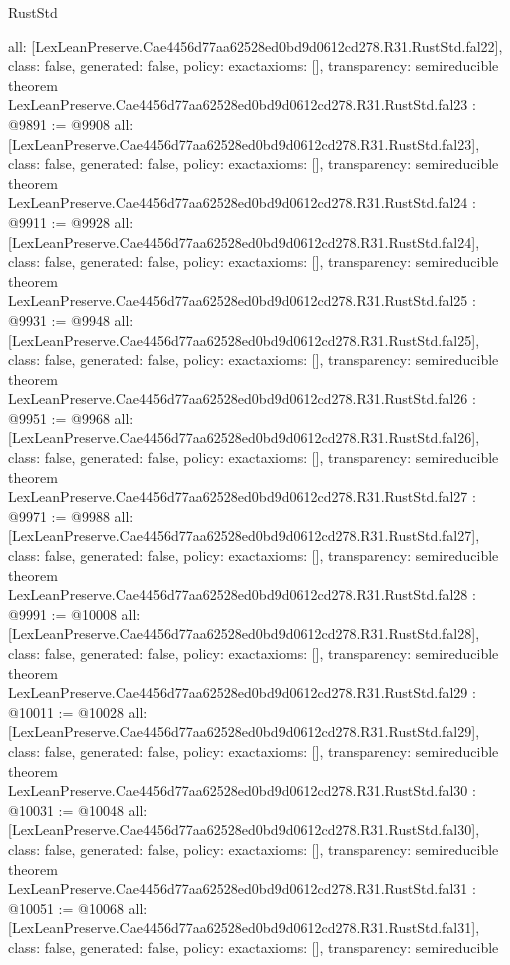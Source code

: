 \begin{lexlean}{RustStd}
\begin{coremodule}
{  all: [LexLeanPreserve.Cae4456d77aa62528ed0bd9d0612cd278.R31.RustStd.fal22],
  class: false,
  generated: false,
  policy: exact{axioms: []},
  transparency: semireducible
}
theorem LexLeanPreserve.Cae4456d77aa62528ed0bd9d0612cd278.R31.RustStd.fal23 : @9891 := @9908 {
  all: [LexLeanPreserve.Cae4456d77aa62528ed0bd9d0612cd278.R31.RustStd.fal23],
  class: false,
  generated: false,
  policy: exact{axioms: []},
  transparency: semireducible
}
theorem LexLeanPreserve.Cae4456d77aa62528ed0bd9d0612cd278.R31.RustStd.fal24 : @9911 := @9928 {
  all: [LexLeanPreserve.Cae4456d77aa62528ed0bd9d0612cd278.R31.RustStd.fal24],
  class: false,
  generated: false,
  policy: exact{axioms: []},
  transparency: semireducible
}
theorem LexLeanPreserve.Cae4456d77aa62528ed0bd9d0612cd278.R31.RustStd.fal25 : @9931 := @9948 {
  all: [LexLeanPreserve.Cae4456d77aa62528ed0bd9d0612cd278.R31.RustStd.fal25],
  class: false,
  generated: false,
  policy: exact{axioms: []},
  transparency: semireducible
}
theorem LexLeanPreserve.Cae4456d77aa62528ed0bd9d0612cd278.R31.RustStd.fal26 : @9951 := @9968 {
  all: [LexLeanPreserve.Cae4456d77aa62528ed0bd9d0612cd278.R31.RustStd.fal26],
  class: false,
  generated: false,
  policy: exact{axioms: []},
  transparency: semireducible
}
theorem LexLeanPreserve.Cae4456d77aa62528ed0bd9d0612cd278.R31.RustStd.fal27 : @9971 := @9988 {
  all: [LexLeanPreserve.Cae4456d77aa62528ed0bd9d0612cd278.R31.RustStd.fal27],
  class: false,
  generated: false,
  policy: exact{axioms: []},
  transparency: semireducible
}
theorem LexLeanPreserve.Cae4456d77aa62528ed0bd9d0612cd278.R31.RustStd.fal28 : @9991 := @10008 {
  all: [LexLeanPreserve.Cae4456d77aa62528ed0bd9d0612cd278.R31.RustStd.fal28],
  class: false,
  generated: false,
  policy: exact{axioms: []},
  transparency: semireducible
}
theorem LexLeanPreserve.Cae4456d77aa62528ed0bd9d0612cd278.R31.RustStd.fal29 : @10011 := @10028 {
  all: [LexLeanPreserve.Cae4456d77aa62528ed0bd9d0612cd278.R31.RustStd.fal29],
  class: false,
  generated: false,
  policy: exact{axioms: []},
  transparency: semireducible
}
theorem LexLeanPreserve.Cae4456d77aa62528ed0bd9d0612cd278.R31.RustStd.fal30 : @10031 := @10048 {
  all: [LexLeanPreserve.Cae4456d77aa62528ed0bd9d0612cd278.R31.RustStd.fal30],
  class: false,
  generated: false,
  policy: exact{axioms: []},
  transparency: semireducible
}
theorem LexLeanPreserve.Cae4456d77aa62528ed0bd9d0612cd278.R31.RustStd.fal31 : @10051 := @10068 {
  all: [LexLeanPreserve.Cae4456d77aa62528ed0bd9d0612cd278.R31.RustStd.fal31],
  class: false,
  generated: false,
  policy: exact{axioms: []},
  transparency: semireducible
}
\end{coremodule}
\end{lexlean}
